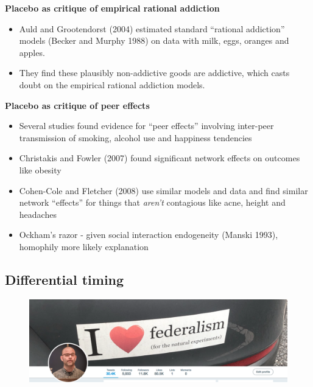 \documentclass[notes=show]{beamer}
\begin{document}
\begin{frame}[plain]
\begin{center}
\textbf{Placebo as critique of empirical rational addiction}
\end{center}

\begin{itemize}
	\item Auld and Grootendorst (2004) estimated standard ``rational addiction'' models (Becker and Murphy 1988) on data with milk, eggs, oranges and apples.  
	\item They find these plausibly non-addictive goods are addictive, which casts doubt on the empirical rational addiction models.
\end{itemize}

\end{frame}

\begin{frame}[plain]
\begin{center}
\textbf{Placebo as critique of peer effects}
\end{center}

\begin{itemize}
	\item Several studies found evidence for ``peer effects'' involving inter-peer transmission of smoking, alcohol use and happiness tendencies
	\item Christakis and Fowler (2007) found significant network effects on outcomes like obesity
	\item Cohen-Cole and Fletcher (2008) use similar models and data and find similar network ``effects'' for things that \emph{aren't} contagious like acne, height and headaches
	\item Ockham's razor - given social interaction endogeneity (Manski 1993), homophily more likely explanation
\end{itemize}

\end{frame}





\subsection{Differential timing}

\begin{frame}
\begin{figure}
\includegraphics[scale=0.25]{./lecture_includes/federalism_sticker.png}
\end{figure}

\end{frame}
\end{document}
